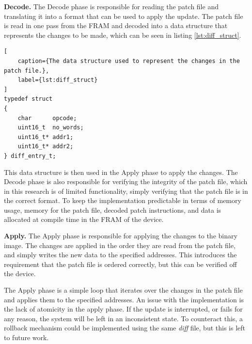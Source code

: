 \textbf{Decode.}
The Decode phase is responsible for reading the patch file and translating it into a format that can be used to apply the update. The patch file is read in one pass from the FRAM and decoded into a data structure that represents the changes to be made, which can be seen in listing \ref{lst:diff_struct}. 
\begin{lstlisting}[
    caption={The data structure used to represent the changes in the patch file.},
    label={lst:diff_struct}
]
typedef struct  
{
    char      opcode;
    uint16_t  no_words;
    uint16_t* addr1;
    uint16_t* addr2;
} diff_entry_t;
\end{lstlisting}
This data structure is then used in the Apply phase to apply the changes. The Decode phase is also responsible for verifying the integrity of the patch file, which in this research is of limited functionality, simply verifying that the patch file is in the correct format. To keep the implementation predictable in terms of memory usage, memory for the patch file, decoded patch instructions, and data is allocated at compile time in the FRAM of the device.

\textbf{Apply.}
The Apply phase is responsible for applying the changes to the binary image. The changes are applied in the order they are read from the patch file, and simply writes the new data to the specified addresses. This introduces the requirement that the patch file is ordered correctly, but this can be verified off the device. 

The Apply phase is a simple loop that iterates over the changes in the patch file and applies them to the specified addresses. An issue with the implementation is the lack of atomicity in the apply phase. If the update is interrupted, or fails for any reason, the system will be left in an inconsistent state. To counteract this, a rollback mechanism could be implemented using the same \textit{diff} file, but this is left to future work.

